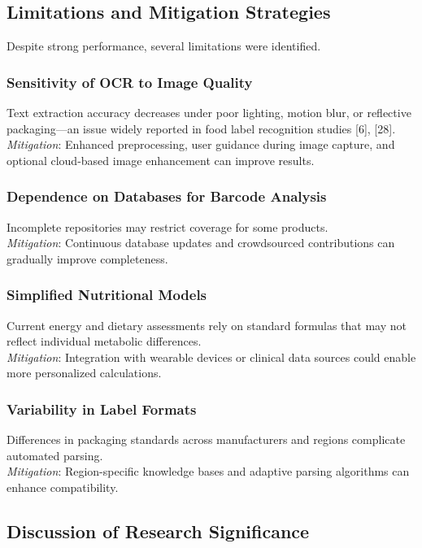 \documentclass[conference]{IEEEtran}
\begin{document}
\subsection{Limitations and Mitigation Strategies}

Despite strong performance, several limitations were identified.

\subsubsection{Sensitivity of OCR to Image Quality}
Text extraction accuracy decreases under poor lighting, motion blur, or reflective packaging—an issue widely reported in food label recognition studies [6], [28].
\\ \textit{Mitigation}: Enhanced preprocessing, user guidance during image capture, and optional cloud-based image enhancement can improve results.

\subsubsection{Dependence on Databases for Barcode Analysis}
Incomplete repositories may restrict coverage for some products.
\\ \textit{Mitigation}: Continuous database updates and crowdsourced contributions can gradually improve completeness.

\subsubsection{Simplified Nutritional Models}
Current energy and dietary assessments rely on standard formulas that may not reflect individual metabolic differences.
\\ \textit{Mitigation}: Integration with wearable devices or clinical data sources could enable more personalized calculations.

\subsubsection{Variability in Label Formats}
Differences in packaging standards across manufacturers and regions complicate automated parsing.
\\ \textit{Mitigation}: Region-specific knowledge bases and adaptive parsing algorithms can enhance compatibility.

\subsection{Discussion of Research Significance}
\end{document}

